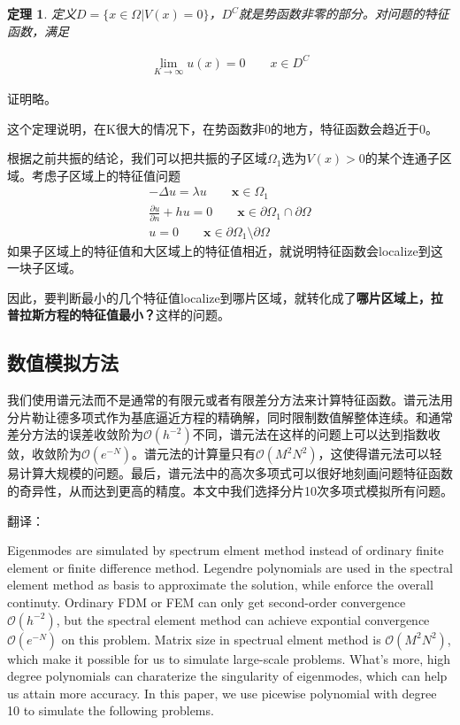 \documentclass[12pt,a4paper]{article}
\newtheorem{theorem}{定理}
\begin{document}
\begin{theorem}

定义$D = \{x \in \Omega | V(x) = 0 \}$，$D^C$就是势函数非零的部分。对问题的特征函数，满足

\begin{align}
\lim_{K \rightarrow \infty} u(x) = 0 \qquad x \in D^C
\end{align}

\end{theorem}

证明略。

这个定理说明，在K很大的情况下，在势函数非0的地方，特征函数会趋近于0。

根据之前共振的结论，我们可以把共振的子区域$\Omega_1$选为$V(x) > 0$的某个连通子区域。考虑子区域上的特征值问题
\begin{align}
-\Delta u = \lambda u \qquad \mathbf{x} \in \Omega_1 \\
\frac{\partial u}{\partial n} + h u = 0 \qquad \mathbf{x} \in \partial \Omega_1 \cap \partial \Omega \\
u = 0 \qquad \mathbf{x} \in \partial \Omega_1 \setminus \partial \Omega
\end{align}
如果子区域上的特征值和大区域上的特征值相近，就说明特征函数会localize到这一块子区域。

因此，要判断最小的几个特征值localize到哪片区域，就转化成了\textbf{哪片区域上，拉普拉斯方程的特征值最小？}这样的问题。

\subsection{数值模拟方法}

我们使用谱元法而不是通常的有限元或者有限差分方法来计算特征函数。谱元法用分片勒让德多项式作为基底逼近方程的精确解，同时限制数值解整体连续。和通常差分方法的误差收敛阶为$\mathcal{O}(h^{-2})$不同，谱元法在这样的问题上可以达到指数收敛，收敛阶为$\mathcal{O}(e^{-N})$。谱元法的计算量只有$\mathcal{O}(M^2 N^2)$，这使得谱元法可以轻易计算大规模的问题。最后，谱元法中的高次多项式可以很好地刻画问题特征函数的奇异性，从而达到更高的精度。本文中我们选择分片10次多项式模拟所有问题。

翻译：

Eigenmodes are simulated by spectrum elment method instead of ordinary finite element or finite difference method. Legendre polynomials are used in the spectral element method as basis to approximate the solution, while enforce the overall continuty. Ordinary FDM or FEM can only get second-order convergence $\mathcal{O}(h^{-2})$, but the spectral element method can achieve expontial convergence $\mathcal{O}(e^{-N})$ on this problem. Matrix size in spectrual elment method is $\mathcal{O}(M^2 N^2)$, which make it possible for us to simulate large-scale problems. What's more, high degree polynomials can charaterize the singularity of eigenmodes, which can help us attain more accuracy. In this paper, we use picewise polynomial with degree 10 to simulate the following problems.
\end{document}

